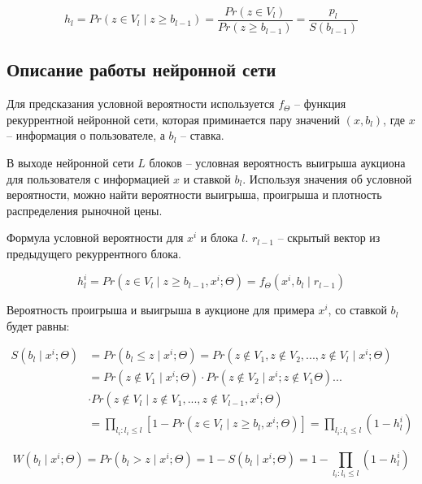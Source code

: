 \documentclass[times,specification,annotation]{itmo-student-thesis}
\begin{document}
\begin{equation}
    h_l = Pr(z \in V_l \mid z \geq b_{l - 1}) = \frac{Pr(z \in V_l)}{Pr(z \geq b_{l - 1})} = \frac{p_l}{S(b_{l - 1})}
\end{equation}

\subsection{Описание работы нейронной сети}

Для предсказания условной вероятности используется 
$f_{\Theta}$ – функция рекуррентной нейронной сети, 
которая приминается пару значений $(x, b_l)$, 
где $x$ – информация о пользователе, а $b_l$ – ставка.

В выходе нейронной сети $L$ блоков – условная вероятность выигрыша аукциона для пользователя с информацией $x$ и ставкой $b_l$. 
Используя значения об условной вероятности, можно найти вероятности выигрыша, проигрыша и плотность распределения рыночной цены.

Формула условной вероятности для $x^i$ и блока $l$. $r_{l-1}$ – скрытый вектор из предыдущего рекуррентного блока.

\begin{equation}
    h_l^i = Pr⁡(z \in V_l \mid z \geq b_{l-1}, x^i; \Theta)= f_{\Theta} (x^i,b_l \mid r_{l-1})
\end{equation}

Вероятность проигрыша и выигрыша в аукционе для примера $x^i$, со ставкой $b_l$ будет равны:

\begin{equation}\label{eq:nnS}
    \begin{split}
        S(b_l \mid x^i; \Theta) & = Pr(b_l \leq z \mid x^i; \Theta) = Pr(z \notin V_1, z \notin V_2, ..., z \notin V_l \mid x^i; \Theta) \\
        & = Pr(z \notin V_1 \mid x^i; \Theta) \cdot Pr(z \notin V_2 \mid x^i; z \notin V_1 \Theta) ... \\
        & \cdot Pr(z \notin V_l \mid z \notin V_1, ..., z \notin V_{l - 1},  x^i; \Theta) \\
        & = \prod_{l_i : l_i \leq l} \left[1 - Pr(z \in V_l \mid z \geq b_l, x^i; \Theta)\right] = \prod_{l_i: l_i \leq l} (1 - h_l^i)
    \end{split}
\end{equation}

\begin{equation}\label{eq:nnW}
    W(b_l \mid x^i; \Theta) = Pr(b_l > z \mid x^i; \Theta) = 1 - S(b_l \mid x^i; \Theta) = 1 - \prod_{l_i: l_i \leq l} (1 - h_l^i)
\end{equation}
\end{document}

